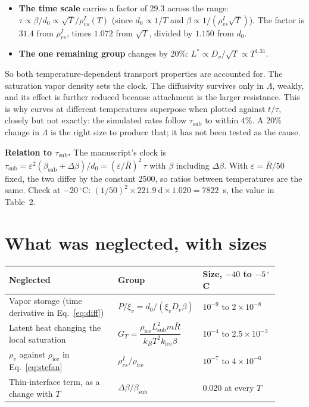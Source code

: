 \documentclass[11pt]{article}
\begin{document}
\begin{itemize}
\item \textbf{The time scale} carries a factor of 29.3 across the range:
  $\tau \propto \beta/d_0 \propto \sqrt T / \rho_{vs}^{I}(T)$ (since
  $d_0 \propto 1/T$ and $\beta \propto 1/(\rho_{vs}^{I}\sqrt T)$). The
  factor is $31.4$ from $\rho_{vs}^{I}$, times $1.072$ from $\sqrt T$,
  divided by $1.150$ from $d_0$.
\item \textbf{The one remaining group} changes by 20\%:
  $L^{*} \propto D_v/\sqrt T \propto T^{1.31}$.
\end{itemize}

So both temperature-dependent transport properties are accounted for. The
saturation vapor density sets the clock. The diffusivity survives only in
$\Lambda$, weakly, and its effect is further reduced because attachment is
the larger resistance. This is why curves at different temperatures
superpose when plotted against $t/\tau$, closely but not exactly: the
simulated rates follow $\tau_{\mathrm{sub}}$ to within 4\%. A 20\% change in
$\Lambda$ is the right size to produce that; it has not been tested as the
cause.

\textbf{Relation to $\tau_{\mathrm{sub}}$.} The manuscript's clock is
$\tau_{\mathrm{sub}} = \varepsilon^{2}(\beta_{\mathrm{sub}} +
\Delta\beta)/d_0 = (\varepsilon/\bar R)^{2}\,\tau$ with $\beta$ including
$\Delta\beta$. With $\varepsilon = \bar R/50$ fixed, the two differ by the
constant 2500, so ratios between temperatures are the same. Check at
$-20\,^{\circ}$C: $(1/50)^{2} \times 221.9~\mathrm{d} \times 1.020 =
7822$~s, the value in Table~2.

\section{What was neglected, with sizes}
\label{sec:neglected}

\begin{center}\begin{tabular}{p{0.40\linewidth}p{0.22\linewidth}p{0.28\linewidth}}\toprule
Neglected & Group & Size, $-40$ to $-5\,^{\circ}$C\\\midrule
Vapor storage (time derivative in Eq.~\ref{eq:diff}) & $P/\xi_v = d_0/(\xi_v D_v\beta)$ & $10^{-9}$ to $2\times10^{-8}$\\
Latent heat changing the local saturation & $G_T = \dfrac{\rho_{\mathrm{ice}} L_{\mathrm{sub}}^{2} m \bar R}{k_B T^{2} k_{\mathrm{ice}}\beta}$ & $10^{-4}$ to $2.5\times10^{-3}$\\[1.5ex]
$\rho_v$ against $\rho_{\mathrm{ice}}$ in Eq.~\eqref{eq:stefan} & $\rho_{vs}^{I}/\rho_{\mathrm{ice}}$ & $10^{-7}$ to $4\times10^{-6}$\\
Thin-interface term, as a change with $T$ & $\Delta\beta/\beta_{\mathrm{sub}}$ & 0.020 at every $T$\\\bottomrule
\end{tabular}\end{center}
\end{document}
